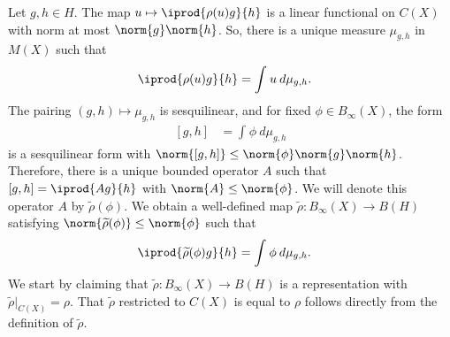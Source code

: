 \documentclass[10pt]{mypackage}
\begin{document}
\begin{theorem}
  Let $g,h\in H$. The map $u\mapsto \iprod{\rho(u)g}{h}$ is a linear functional on $C(X)$ with norm at most $\norm{g}\norm{h}$. So, there is a unique measure $\mu_{g,h}$ in $M(X)$ such that
  \begin{align*}
    \iprod{\rho(u)g}{h} &= \int_{}^{} u\:d\mu_{g,h}.
  \end{align*}
  The pairing $ \left( g,h \right)\mapsto \mu_{g,h} $ is sesquilinear, and for fixed $\phi\in B_{\infty}(X)$, the form
  \begin{align*}
    \left[ g,h \right] &= \int_{}^{} \phi\:d\mu_{g,h}
  \end{align*}
  is a sesquilinear form with $ \norm{\left[ g,h \right]}\leq \norm{\phi}\norm{g}\norm{h} $. Therefore, there is a unique bounded operator $A$ such that $ \left[ g,h \right] = \iprod{Ag}{h} $ with $\norm{A}\leq \norm{\phi}$. We will denote this operator $A$ by $ \widetilde{\rho}(\phi) $. We obtain a well-defined map $ \widetilde{\rho}\colon B_{\infty}(X)\rightarrow B(H) $ satisfying $ \norm{ \widetilde{\rho}(\phi) }\leq \norm{\phi} $ such that
  \begin{align*}
    \iprod{ \widetilde{\rho}(\phi)g }{h} &= \int_{}^{} \phi\:d\mu_{g,h}.
  \end{align*}
  We start by claiming that $ \widetilde{\rho}\colon B_{\infty}(X)\rightarrow B(H) $ is a representation with $ \widetilde{\rho}|_{C(X)} = \rho $. That $ \widetilde{\rho} $ restricted to $C(X)$ is equal to $\rho$ follows directly from the definition of $ \widetilde{\rho} $.


\end{theorem}
\end{document}
